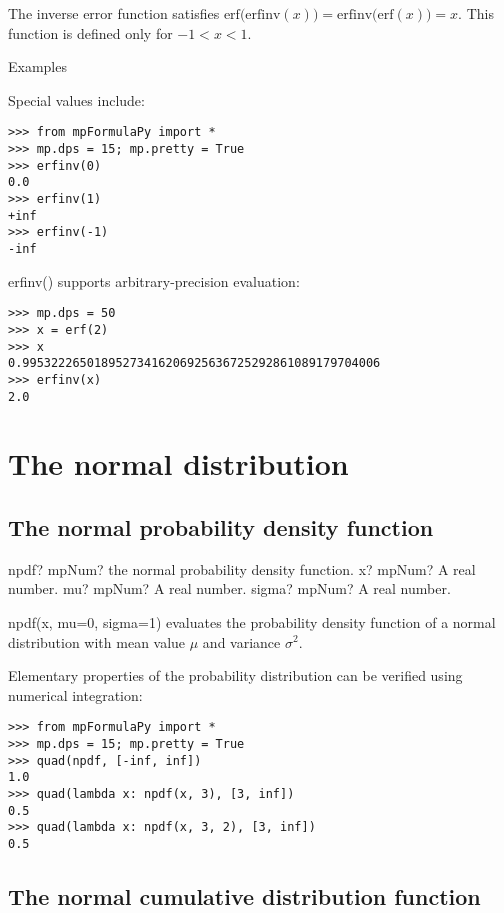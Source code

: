 \vpara
The inverse error function satisfies $\text{erf(erfinv}(x))=\text{erfinv(erf}(x))=x$. This function is defined only for $-1<x<1$.

Examples

Special values include:

\begin{lstlisting}
>>> from mpFormulaPy import *
>>> mp.dps = 15; mp.pretty = True
>>> erfinv(0)
0.0
>>> erfinv(1)
+inf
>>> erfinv(-1)
-inf
\end{lstlisting}

erfinv() supports arbitrary-precision evaluation:

\begin{lstlisting}
>>> mp.dps = 50
>>> x = erf(2)
>>> x
0.99532226501895273416206925636725292861089179704006
>>> erfinv(x)
2.0\end{lstlisting}



\newpage
\section{The normal distribution}
\subsection{The normal probability density function}


\begin{mpFunctionsExtract}
	\mpFunctionThree
	{npdf? mpNum? the normal probability density function.}
	{x? mpNum? A real number.}
	{mu? mpNum? A real number.}
	{sigma? mpNum? A real number.}
\end{mpFunctionsExtract}

\vpara
npdf(x, mu=0, sigma=1) evaluates the probability density function of a normal distribution with mean value $\mu$ and variance $\sigma^2$.

Elementary properties of the probability distribution can be verified using numerical integration:

\begin{lstlisting}
>>> from mpFormulaPy import *
>>> mp.dps = 15; mp.pretty = True
>>> quad(npdf, [-inf, inf])
1.0
>>> quad(lambda x: npdf(x, 3), [3, inf])
0.5
>>> quad(lambda x: npdf(x, 3, 2), [3, inf])
0.5
\end{lstlisting}



\subsection{The normal cumulative distribution function}



